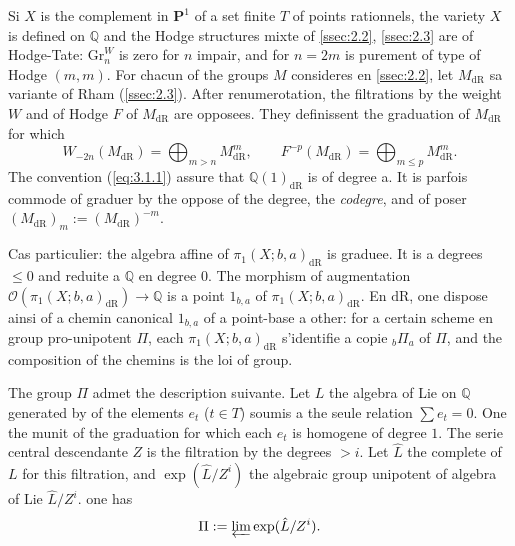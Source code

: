 \documentclass[11pt,a4paper]{article}
\theoremstyle{plain}
\theoremstyle{definition}
\newcommand{\Q}{\mathbb{Q}}
\newcommand{\dR}{\mathrm{dR}}
\newcommand{\Gr}{\mathrm{Gr}}
\begin{document}
Si $X$ is the complement in $\mathbf{P}^1$ of a set finite $T$ of points rationnels, the variety $X$ is defined on $\Q$ and the Hodge structures mixte of \ref{ssec:2.2}, \ref{ssec:2.3} are of Hodge-Tate: $\Gr_n^W$ is zero for $n$ impair, and for $n = 2m$ is purement of type of Hodge $(m,m)$. For chacun of the groups $M$ consideres en \ref{ssec:2.2}, let $M_{\dR}$ sa variante of Rham (\ref{ssec:2.3}). After renumerotation, the filtrations by the weight $W$ and of Hodge $F$ of $M_{\dR}$ are opposees. They definissent the graduation of $M_{\dR}$ for which
\begin{equation}\label{eq:3.1.1}
W_{-2n}(M_{\dR}) = \bigoplus_{m>n} M_{\dR}^m, \qquad F^{-p}(M_{\dR}) = \bigoplus_{m \leq p} M_{\dR}^m.
\end{equation}
The convention (\ref{eq:3.1.1}) assure that $\Q(1)_{\dR}$ is of degree a. It is parfois commode of graduer by the oppose of the degree, the \emph{codegre}, and of poser $(M_{\dR})_m := (M_{\dR})^{-m}$.

Cas particulier: the algebra affine of $\pi_1(X;b,a)_{\dR}$ is graduee. It is a degrees $\leq 0$ and reduite a $\Q$ en degree $0$. The morphism of augmentation $\mathcal{O}(\pi_1(X;b,a)_{\dR}) \to \Q$ is a point $1_{b,a}$ of $\pi_1(X;b,a)_{\dR}$. En $\dR$, one dispose ainsi of a chemin canonical $1_{b,a}$ of a point-base a other: for a certain scheme en group pro-unipotent $\Pi$, each $\pi_1(X;b,a)_{\dR}$ s'identifie a copie ${}_b\Pi_a$ of $\Pi$, and the composition of the chemins is the loi of group.

The group $\Pi$ admet the description suivante. Let $L$ the algebra of Lie on $\Q$ generated by of the elements $e_t$ ($t \in T$) soumis a the seule relation $\sum e_t = 0$. One the munit of the graduation for which each $e_t$ is homogene of degree $1$. The serie central descendante $Z$ is the filtration by the degrees $> i$. Let $\hat{L}$ the complete of $L$ for this filtration, and $\exp(\hat{L}/Z^i)$ the algebraic group unipotent of algebra of Lie $\hat{L}/Z^i$. one has
\begin{equation}\label{eq:3.1.2}
\Pi := \varprojlim \exp(\hat{L}/Z^i).
\end{equation}
\end{document}
